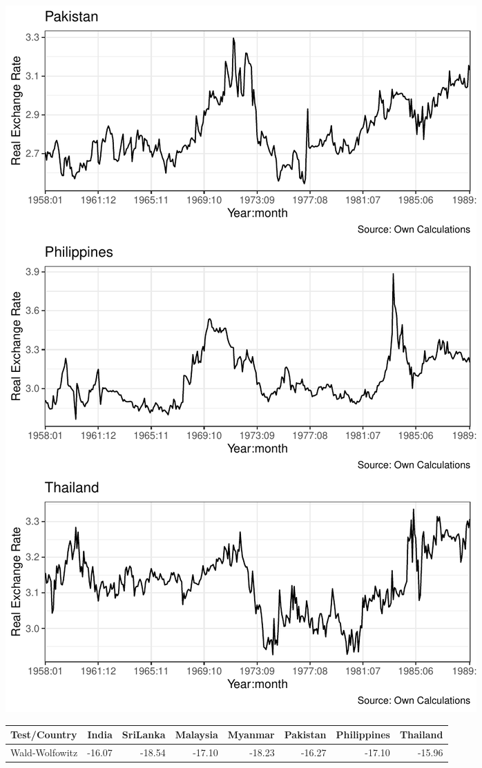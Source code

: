 \documentclass[11pt,preprint, authoryear]{elsarticle}
\let\origfigure\figure
\let\endorigfigure\endfigure
\renewenvironment{figure}[1][2] {
    \expandafter\origfigure\expandafter[H]
} {
    \endorigfigure
}
\let\origtable\table
\let\endorigtable\endtable
\renewenvironment{table}[1][2] {
    \expandafter\origtable\expandafter[H]
} {
    \endorigtable
}
\numberwithin{equation}{section}
\numberwithin{figure}{section}
\numberwithin{table}{section}
\begin{document}
\begin{figure}[H]

{\centering \includegraphics{20346212_files/figure-latex/Figure2-1} 

}

\caption{Plot of Real Exchange Rates over Time\label{Figure1}}\label{fig:Figure2}
\end{figure}

\begin{table}[H]
\centering
\caption{Wald-Wolfowitz tests \label{tab1}} 
\begin{tabular}{lrrrrrrr}
  \hline
Test/Country & India & SriLanka & Malaysia & Myanmar & Pakistan & Philippines & Thailand \\ 
  \hline
Wald-Wolfowitz & -16.07 & -18.54 & -17.10 & -18.23 & -16.27 & -17.10 & -15.96 \\ 
   \hline
\end{tabular}
\end{table}
\end{document}
